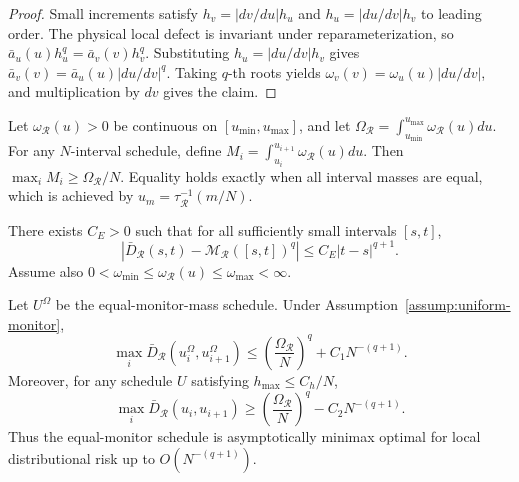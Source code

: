 \begin{proof}
Small increments satisfy
$h_v=|dv/du|h_u$ and $h_u=|du/dv|h_v$ to leading order. The physical local
defect is invariant under reparameterization, so
$\bar a_u(u)h_u^q=\bar a_v(v)h_v^q$. Substituting
$h_u=|du/dv|h_v$ gives
$\bar a_v(v)=\bar a_u(u)|du/dv|^q$. Taking $q$-th roots yields
$\omega_v(v)=\omega_u(u)|du/dv|$, and multiplication by $dv$ gives the claim.
\end{proof}

\begin{lemma}
\label{lem:equal-monitor-mass}
Let $\omega_{\mathcal R}(u)>0$ be continuous on
$[u_{\min},u_{\max}]$, and let
$\Omega_{\mathcal R}=\int_{u_{\min}}^{u_{\max}}\omega_{\mathcal R}(u)du$.
For any $N$-interval schedule, define
$M_i=\int_{u_i}^{u_{i+1}}\omega_{\mathcal R}(u)du$. Then
$\max_i M_i\ge\Omega_{\mathcal R}/N$. Equality holds exactly when all
interval masses are equal, which is achieved by
$u_m=\tau_{\mathcal R}^{-1}(m/N)$.
\end{lemma}

\begin{assumption}
\label{assump:uniform-monitor}
There exists $C_E>0$ such that for all sufficiently small intervals $[s,t]$,
\begin{equation}
  \left|
  \bar D_{\mathcal R}(s,t)-\mathcal M_{\mathcal R}([s,t])^q
  \right|
  \le C_E|t-s|^{q+1}.
\end{equation}
Assume also
$0<\omega_{\min}\le\omega_{\mathcal R}(u)\le\omega_{\max}<\infty$.
\end{assumption}

\begin{theorem}
\label{thm:minimax}
Let $U^\Omega$ be the equal-monitor-mass schedule. Under
Assumption~\ref{assump:uniform-monitor},
\begin{equation}
  \max_i\bar D_{\mathcal R}(u_i^\Omega,u_{i+1}^\Omega)
  \le
  \left(\frac{\Omega_{\mathcal R}}{N}\right)^q
  +C_1N^{-(q+1)}.
\end{equation}
Moreover, for any schedule $U$ satisfying $h_{\max}\le C_h/N$,
\begin{equation}
  \max_i\bar D_{\mathcal R}(u_i,u_{i+1})
  \ge
  \left(\frac{\Omega_{\mathcal R}}{N}\right)^q
  -C_2N^{-(q+1)}.
\end{equation}
Thus the equal-monitor schedule is asymptotically minimax optimal for local
distributional risk up to $O(N^{-(q+1)})$.
\end{theorem}

